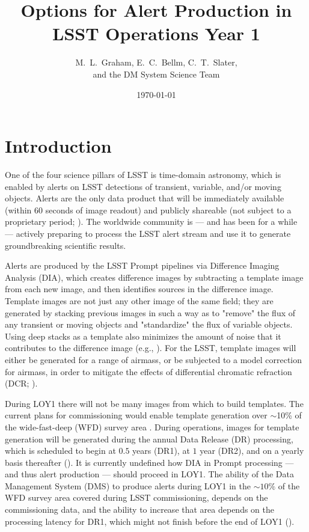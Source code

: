 \documentclass[DM,lsstdraft,toc]{lsstdoc}
\title[Alert Production in Year 1]{Options for Alert Production in \\ LSST Operations Year 1}
\author{M.~L.~Graham, E.~C.~Bellm, C.~T.~Slater, \\ and the DM System Science Team}
\date{\today}
\begin{document}
\maketitle


\section{Introduction} \label{sec:intro}

One of the four science pillars of LSST is time-domain astronomy, which is enabled by alerts on LSST detections of transient, variable, and/or moving objects. Alerts are the only data product that will be immediately available (within $60$ seconds of image readout) and publicly shareable (not subject to a proprietary period; ).
The worldwide community is --- and has been for a while --- actively preparing to process the LSST alert stream and use it to generate groundbreaking scientific results. 

Alerts are produced by the LSST Prompt pipelines via Difference Imaging Analysis (DIA), which creates difference images by subtracting a template image from each new image, and then identifies sources in the difference image.
Template images are not just any other image of the same field; they are generated by stacking previous images in such a way as to "remove" the flux of any transient or moving objects and "standardize" the flux of variable objects.
Using deep stacks as a template also minimizes the amount of noise that it contributes to the difference image (e.g., ).
For the LSST, template images will either be generated for a range of airmass, or be subjected to a model correction for airmass, in order to mitigate the effects of differential chromatic refraction (DCR; ).

During LOY1 there will not be many images from which to build templates.
The current plans for commissioning would enable template generation over $\sim$10\% of the wide-fast-deep (WFD) survey area .
During operations, images for template generation will be generated during the annual Data Release (DR) processing, which is scheduled to begin at $0.5$ years (DR1), at $1$ year (DR2), and on a yearly basis thereafter ().
It is currently undefined how DIA in Prompt processing --- and thus alert production --- should proceed in LOY1.
The ability of the Data Management System (DMS) to produce alerts during LOY1 in the $\sim10\%$ of the WFD survey area covered during LSST commissioning, depends on the  commissioning data,  and the ability to increase that area depends on the processing latency for DR1, which might not finish before the end of LOY1 ().  
\end{document}

